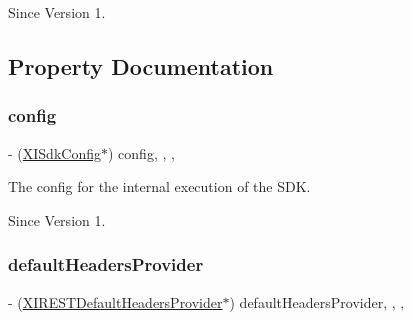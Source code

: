 \begin{DoxySince}{Since}
Version 1. 
\end{DoxySince}


\subsection{Property Documentation}
\hypertarget{category_x_i_r_e_s_t_call_provider_internal_07_08_a1c338592900db5b63706135de8866126}{}\label{category_x_i_r_e_s_t_call_provider_internal_07_08_a1c338592900db5b63706135de8866126} 
\subsubsection{\texorpdfstring{config}{config}}
{\footnotesize\ttfamily -\/ (\hyperlink{class_x_i_sdk_config}{X\+I\+Sdk\+Config}$\ast$) config\hspace{0.3cm}{\ttfamily [read]}, {\ttfamily [write]}, {\ttfamily [nonatomic]}, {\ttfamily [strong]}}



The config for the internal execution of the S\+DK. 

\begin{DoxySince}{Since}
Version 1. 
\end{DoxySince}
\hypertarget{category_x_i_r_e_s_t_call_provider_internal_07_08_a76c4c018045f7a6e81b4065c009596bd}{}\label{category_x_i_r_e_s_t_call_provider_internal_07_08_a76c4c018045f7a6e81b4065c009596bd} 
\subsubsection{\texorpdfstring{default\+Headers\+Provider}{defaultHeadersProvider}}
{\footnotesize\ttfamily -\/ (\hyperlink{interface_x_i_r_e_s_t_default_headers_provider}{X\+I\+R\+E\+S\+T\+Default\+Headers\+Provider}$\ast$) default\+Headers\+Provider\hspace{0.3cm}{\ttfamily [read]}, {\ttfamily [write]}, {\ttfamily [nonatomic]}, {\ttfamily [strong]}}



